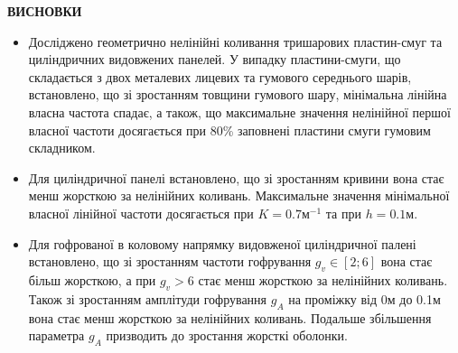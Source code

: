 \documentclass[8pt]{beamer}
\numberwithin{figure}{section}
\numberwithin{equation}{section}
\numberwithin{table}{section}
\begin{document}
\begin{frame}
\textbf{\large ВИСНОВКИ}
\\
\vspace{1em}
\begin{itemize}
\item  Досліджено геометрично нелінійні коливання тришарових пластин-смуг та циліндричних видовжених панелей. У випадку пластини-смуги, що складається з двох металевих лицевих та гумового середнього шарів, встановлено, що зі зростанням товщини гумового шару, мінімальна лінійна власна частота спадає, а також, що максимальне значення нелінійної першої власної частоти досягається при 80\% заповнені пластини смуги гумовим складником. 
\item Для циліндричної панелі встановлено, що зі зростанням кривини вона стає менш жорсткою за нелінійних коливань. Максимальне значення мінімальної власної лінійної частоти досягається при $K=0.7 м^{-1}$ та при $h=0.1 м$.
\item  Для гофрованої в коловому напрямку видовженої циліндричної палені встановлено, що зі зростанням частоти гофрування $g_v \in [2;6]$ вона стає більш жорсткою, а при $g_v > 6$ стає менш жорсткою за нелінійних коливань. Також зі зростанням амплітуди гофрування $g_A$ на проміжку від 0м до 0.1м вона стає менш жорсткою за нелінійних коливань. Подальше збільшення параметра $g_A$ призводить до зростання жорсткі оболонки.

\end{itemize}



\end{frame}
\end{document}
